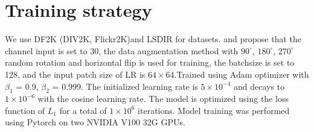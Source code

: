 \documentclass[10pt,twocolumn,letterpaper]{article}
\begin{document}
\section{Training strategy}
We use DF2K (DIV2K\cite{DIV2K}, Flickr2K\cite{EDSR})and LSDIR for datasets. and propose that the channel input is set to 30, the data augmentation method with $90^\circ$, $180^\circ$, $270^\circ$ random rotation and horizontal flip is used for training, the batchsize is set to 128, and the input patch size of LR is $64\times64$.Trained using Adam optimizer\cite{Adam} with $\beta_1$ = 0.9, $\beta_2$ = 0.999. The initialized learning rate is $5\times10^{-4}$ and decays to $1\times10^{-6}$ with the cosine learning rate. The model is optimized using the loss function of $L_1$ for a total of $1\times10^6$ iterations. Model training was performed using Pytorch\cite{pytorch} on two NVIDIA V100 32G GPUs.

{\small


}
\end{document}
